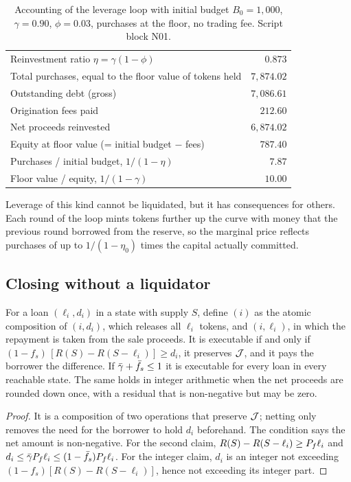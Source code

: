 \begin{table}[t]
\centering\small
\caption{Accounting of the leverage loop with initial budget $B_0=1{,}000$, $\gamma=0.90$, $\phi=0.03$, purchases at the floor, no trading fee. Script block N01.}\label{tab:loop}
\begin{tabular}{@{}lr@{}}
\toprule
Reinvestment ratio $\eta=\gamma(1-\phi)$ & $0.873$\\
Total purchases, equal to the floor value of tokens held & $7{,}874.02$\\
Outstanding debt (gross) & $7{,}086.61$\\
Origination fees paid & $212.60$\\
Net proceeds reinvested & $6{,}874.02$\\
Equity at floor value (= initial budget $-$ fees) & $787.40$\\
Purchases / initial budget, $1/(1-\eta)$ & $7.87$\\
Floor value / equity, $1/(1-\gamma)$ & $10.00$\\
\bottomrule
\end{tabular}
\end{table}

Leverage of this kind cannot be liquidated, but it has consequences for others. Each round of the loop mints tokens further up the curve with money that the previous round borrowed from the reserve, so the marginal price reflects purchases of up to $1/(1-\eta_0)$ times the capital actually committed.

\subsection{Closing without a liquidator}

\begin{proposition}\label{prop:netclose}
For a loan $(\ell_i,d_i)$ in a state with supply $S$, define $(i)$ as the atomic composition of $(i,d_i)$, which releases all $\ell_i$ tokens, and $(i,\ell_i)$, in which the repayment is taken from the sale proceeds. It is executable if and only if $(1-f_s)\,[R(S)-R(S-\ell_i)]\ge d_i$, it preserves $\mathcal{J}$, and it pays the borrower the difference. If $\bar\gamma+\bar f_s\le1$ it is executable for every loan in every reachable state. The same holds in integer arithmetic when the net proceeds are rounded down once, with a residual that is non-negative but may be zero.
\end{proposition}
\begin{proof}
It is a composition of two operations that preserve $\mathcal{J}$; netting only removes the need for the borrower to hold $d_i$ beforehand. The condition says the net amount is non-negative. For the second claim, $R(S)-R(S-\ell_i)\ge P_f\ell_i$ and $d_i\le\bar\gamma P_f\ell_i\le(1-\bar f_s)P_f\ell_i$. For the integer claim, $d_i$ is an integer not exceeding $(1-f_s)[R(S)-R(S-\ell_i)]$, hence not exceeding its integer part.
\end{proof}

